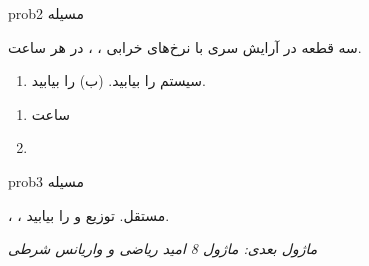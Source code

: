 \begin{PSbox}[unbreakable]{prob}{مسیله 2}

سه قطعه در آرایش سری با نرخ‌های خرابی ، ،  در هر ساعت.

\begin{enumerate}
\def\labelenumi{(\PSalph{enumi})}
\tightlist
\item
   سیستم را بیابید. (ب)  را بیابید.
\end{enumerate}

\PSsolution{} 

\begin{enumerate}
\def\labelenumi{(\PSalph{enumi})}
\tightlist
\item
   ساعت
\item
\end{enumerate}

\end{PSbox}

\begin{PSbox}[unbreakable]{prob}{مسیله 3}

، ، مستقل. توزیع و  را بیابید.

\PSsolution{} 

\emph{ماژول بعدی: {ماژول 8  امید ریاضی و واریانس شرطی}}

\end{PSbox}

